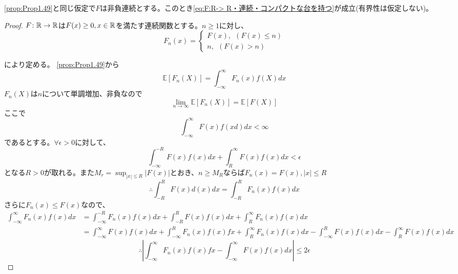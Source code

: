 \documentclass[dvipdfmx, leqno]{jsbook}
\begin{document}
\begin{souprop}
    \ref{prop:Prop1.49}と同じ仮定で$F$は非負連続とする。このとき\eqref{eq:F:R-> R・連続・コンパクトな台を持つ}が成立(有界性は仮定しない)。
\end{souprop}
\begin{proof}
    $F\colon \mathbb{R}\to \mathbb{R}$は$F(x)\ge 0, x\in \mathbb{R}$を満たす連続関数とする。$n\ge 1$に対し、
\begin{equation}
    F_n(x)
    = 
\begin{cases}
    F(x),\ \ (F(x)\le n)\\
    n,\ \ (F(x)> n)
\end{cases}
\end{equation}
\begin{tikzpicture}
\end{tikzpicture}
    により定める。
    \ref{prop:Prop1.49}から
\begin{equation}
    \mathbb{E}[F_n(X)]= \int_{-\infty}^\infty F_n(x)f(X)dx
\end{equation}
    $F_n(X)$は$n$について単調増加、非負なので
\begin{equation}
    \lim_{n\to \infty} \mathbb{E}[F_n(X)]= \mathbb{E}[F(X)]
\end{equation}
    ここで
\begin{equation}
    \int_{-\infty}^\infty F(x)f(xd)dx< \infty
\end{equation}
    であるとする。$\forall \epsilon> 0$に対して、
\begin{equation}
    \int_{-\infty}^{-R} F(x)f(x)dx+ \int_R^\infty F(x)f(x)dx< \epsilon
\end{equation}
    となる$R> 0$が取れる。また$M_r= \sup_{|x|\le R} |F(x)|$とおき、$n\ge M_R$ならば$F_n(x)= F(x), |x|\le R$
\begin{equation}
    \therefore \int_{-R}^R F(x)d(x)dx= \int_{-R}^R F_n(x)f(x)dx
\end{equation}
    さらに$F_n(x)\le F(x)$なので、
\begin{align}
    \int_{-\infty}^\infty F_n(x)f(x)dx
    &= \int_{-\infty}^{-R} F_n(x)f(x)dx+ \int_{-R}^R F(x)f(x)dx+ \int_R^\infty F_n(x)f(x)dx\\
    &= \int_{-\infty}^\infty F(x)f(x)dx+ \int_{-\infty}^R F_n(x)f(x)fx+ \int_R^\infty F_n(x)f(x)dx- \int_{-\infty}^R F(x)f(x)dx- \int_R^\infty F(x)f(x)dx
\end{align}
\begin{equation}
    \therefore \left|\int_{-\infty}^\infty F_n(x)f(x)fx- \int_{-\infty}^\infty F(x)f(x)dx\right|\le 2\epsilon

\end{equation}
\end{proof}
\end{document}
